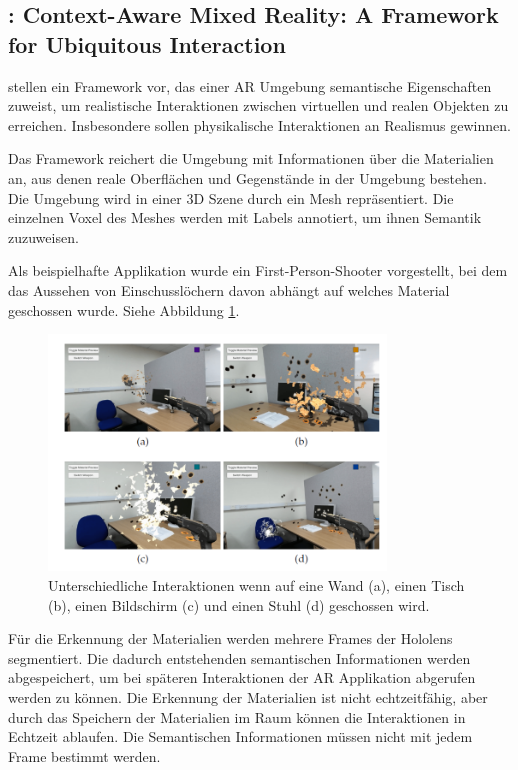 \subsection{\cite{contextawaremixedreality}: Context-Aware Mixed Reality: A Framework for Ubiquitous Interaction}

\cite{contextawaremixedreality} stellen ein Framework vor, das einer AR Umgebung semantische Eigenschaften zuweist, um realistische Interaktionen zwischen virtuellen und realen Objekten zu erreichen. 
Insbesondere sollen physikalische Interaktionen an Realismus gewinnen.

Das Framework reichert die Umgebung mit Informationen über die Materialien an, aus denen reale Oberflächen und Gegenstände in der Umgebung bestehen. 
Die Umgebung wird in einer 3D Szene durch ein Mesh repräsentiert. Die einzelnen Voxel des Meshes werden mit Labels annotiert, um ihnen Semantik zuzuweisen.

Als beispielhafte Applikation wurde ein First-Person-Shooter vorgestellt, bei dem das Aussehen von Einschusslöchern davon abhängt auf welches Material geschossen wurde. Siehe Abbildung \ref{img:game}.

\begin{figure}[H]
	\centering
	\includegraphics[width=0.8\textwidth]{images/img_shootinggame.png}
	\caption[]{Unterschiedliche Interaktionen wenn auf eine Wand (a), einen Tisch (b), einen Bildschirm (c) und einen Stuhl (d) geschossen wird.\citep{contextawaremixedreality}}
	\label{img:game}
\end{figure}

Für die Erkennung der Materialien werden mehrere Frames der Hololens segmentiert.
Die dadurch entstehenden semantischen Informationen werden abgespeichert, um bei späteren Interaktionen der AR Applikation abgerufen werden zu können. Die Erkennung der Materialien ist nicht echtzeitfähig, aber durch das Speichern der Materialien im Raum können die Interaktionen in Echtzeit ablaufen. Die Semantischen Informationen müssen nicht mit jedem Frame bestimmt werden.

